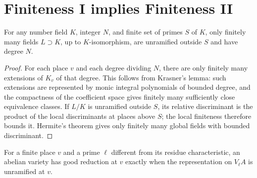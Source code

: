 \section{Finiteness I implies Finiteness II}

\begin{theorem}
\label{thm:milne-bounded-number-fields}

For any number field $K$, integer $N$, and finite set of primes $S$ of $K$,
only finitely many fields $L\supset K$, up to $K$-isomorphism, are unramified
outside $S$ and have degree $N$.
\end{theorem}

\begin{proof}

For each place $v$ and each degree dividing $N$, there are only finitely many
extensions of $K_v$ of that degree.  This follows from Krasner's lemma: such
extensions are represented by monic integral polynomials of bounded degree,
and the compactness of the coefficient space gives finitely many sufficiently
close equivalence classes.  If $L/K$ is unramified outside $S$, its relative
discriminant is the product of the local discriminants at places above $S$;
the local finiteness therefore bounds it.  Hermite's theorem gives only
finitely many global fields with bounded discriminant.

\end{proof}


\begin{theorem}
\label{thm:milne-good-reduction-criterion}

For a finite place $v$ and a prime $\ell$ different from its residue
characteristic, an abelian variety has good reduction at $v$ exactly when the
representation on $V_\ell A$ is unramified at $v$.
\end{theorem}

